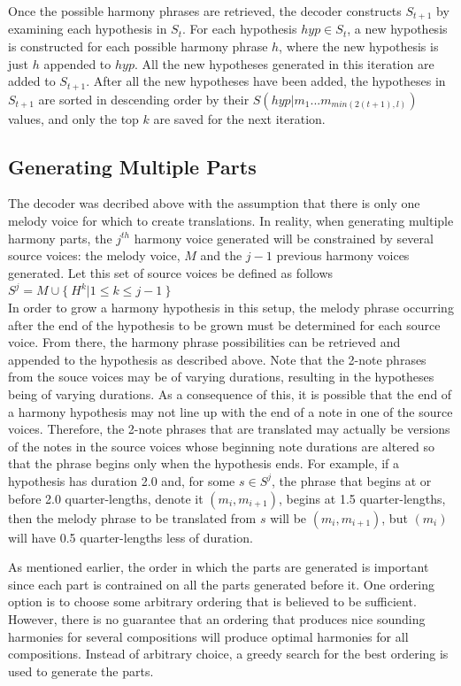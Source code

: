 \documentclass{sig-alternate}
\begin{document}
Once the possible harmony phrases are retrieved, the decoder constructs $S_{t + 1}$ by examining each hypothesis in $S_{t}$. For each hypothesis $hyp \in S_{t}$, a new hypothesis is constructed for each possible harmony phrase $h$, where the new hypothesis is just $h$ appended to $hyp$. All the new hypotheses generated in this iteration are added to $S_{t + 1}$. After all the new hypotheses have been added, the hypotheses in $S_{t + 1}$ are sorted in descending order by their $S(hyp | m_{1} ... m_{min(2(t +1), l)})$ values, and only the top $k$ are saved for the next iteration.

\subsection {Generating Multiple Parts}
The decoder was decribed above with the assumption that there is only one melody voice for  which to create translations. In reality, when generating multiple harmony parts, the $j^{th}$ harmony voice generated will be constrained by several source voices: the melody voice, $M$ and the $j-1$ previous harmony voices generated. Let this set of source voices be defined as follows\\

$S^{j} = {M} \cup \{\ H^k | 1 \leq k \leq j- 1\ \} $\\

In order to grow a harmony hypothesis in this setup, the melody phrase occurring after the end of the hypothesis to be grown must be determined for each source voice. From there, the harmony phrase possibilities can be retrieved and appended to the hypothesis as described above. Note that the 2-note phrases from the souce voices may be of varying durations, resulting in the hypotheses being of varying durations. As a consequence of this, it is possible that the end of a harmony hypothesis may not line up with the end of a note in one of the source voices. Therefore, the 2-note phrases that are translated may actually be versions of the notes in the source voices whose beginning note durations are altered so that the phrase begins only when the hypothesis ends. For example, if a hypothesis has duration 2.0 and, for some $s \in S^{j}$, the phrase that begins at or before 2.0 quarter-lengths, denote it $(m_{i}, m_{i + 1})$, begins at 1.5 quarter-lengths, then the melody phrase to be translated from $s$ will be $(m_{i}, m_{i + 1})$, but $(m_{i})$ will have 0.5 quarter-lengths less of duration. 

As mentioned earlier, the order in which the parts are generated is important since each part is contrained on all the parts generated before it. One ordering option is to choose some arbitrary ordering that is believed to be sufficient. However, there is no guarantee that an ordering that produces nice sounding harmonies for several compositions will produce optimal harmonies for all compositions. Instead of arbitrary choice, a greedy search for the best ordering is used to generate the parts.
\end{document}
